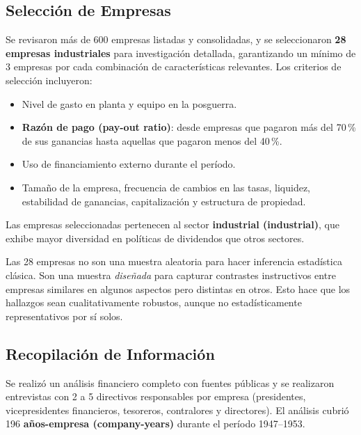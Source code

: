 \documentclass[12pt]{article}
\begin{document}
\subsection{Selecci\'on de Empresas}

Se revisaron m\'as de 600 empresas listadas y consolidadas, y se seleccionaron
\textbf{28 empresas industriales} para investigaci\'on detallada, garantizando un m\'inimo
de 3 empresas por cada combinaci\'on de caracter\'isticas relevantes. Los criterios de
selecci\'on incluyeron:

\begin{itemize}
  \item Nivel de gasto en planta y equipo en la posguerra.
  \item \textbf{Raz\'on de pago (pay-out ratio)}: desde empresas que pagaron m\'as del 70\,\%
        de sus ganancias hasta aquellas que pagaron menos del 40\,\%.
  \item Uso de financiamiento externo durante el per\'iodo.
  \item Tama\~no de la empresa, frecuencia de cambios en las tasas, liquidez, estabilidad
        de ganancias, capitalizaci\'on y estructura de propiedad.
\end{itemize}

Las empresas seleccionadas pertenecen al sector \textbf{industrial (industrial)}, que exhibe
mayor diversidad en pol\'iticas de dividendos que otros sectores.

\begin{intuicion}
Las 28 empresas no son una muestra aleatoria para hacer inferencia estad\'istica cl\'asica.
Son una muestra \textit{dise\~nada} para capturar contrastes instructivos entre empresas
similares en algunos aspectos pero distintas en otros. Esto hace que los hallazgos sean
cualitativamente robustos, aunque no estad\'isticamente representativos por s\'i solos.
\end{intuicion}

\subsection{Recopilaci\'on de Informaci\'on}

Se realiz\'o un an\'alisis financiero completo con fuentes p\'ublicas y se realizaron
entrevistas con 2 a 5 directivos responsables por empresa (presidentes, vicepresidentes
financieros, tesoreros, contralores y directores). El an\'alisis cubri\'o 196
\textbf{a\~nos-empresa (company-years)} durante el per\'iodo 1947--1953.
\end{document}
